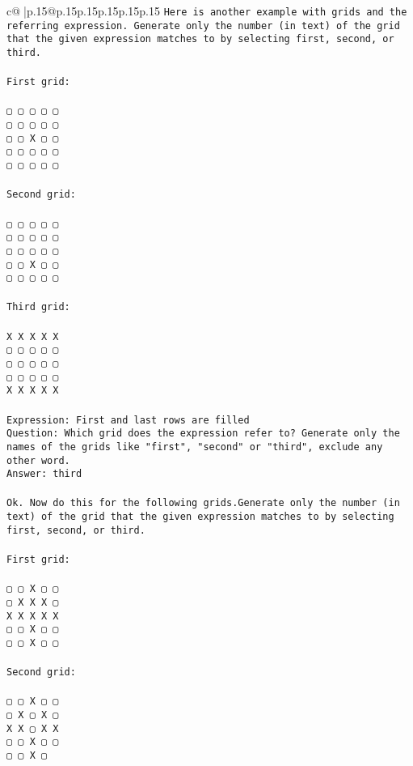\documentclass{article}
\begin{document}
{\begin{supertabular}{c@{$\;$}|p{.15\linewidth}@{}p{.15\linewidth}p{.15\linewidth}p{.15\linewidth}p{.15\linewidth}p{.15\linewidth}}
{{{\tt Here is another example with grids and the referring expression. Generate only the number (in text) of the grid that the given expression matches to by selecting first, second, or third.\\ \tt \\ \tt First grid:\\ \tt \\ \tt ▢ ▢ ▢ ▢ ▢\\ \tt ▢ ▢ ▢ ▢ ▢\\ \tt ▢ ▢ X ▢ ▢\\ \tt ▢ ▢ ▢ ▢ ▢\\ \tt ▢ ▢ ▢ ▢ ▢\\ \tt \\ \tt Second grid:\\ \tt \\ \tt ▢ ▢ ▢ ▢ ▢\\ \tt ▢ ▢ ▢ ▢ ▢\\ \tt ▢ ▢ ▢ ▢ ▢\\ \tt ▢ ▢ X ▢ ▢\\ \tt ▢ ▢ ▢ ▢ ▢\\ \tt \\ \tt Third grid:\\ \tt \\ \tt X X X X X\\ \tt ▢ ▢ ▢ ▢ ▢\\ \tt ▢ ▢ ▢ ▢ ▢\\ \tt ▢ ▢ ▢ ▢ ▢\\ \tt X X X X X\\ \tt \\ \tt Expression: First and last rows are filled\\ \tt Question: Which grid does the expression refer to? Generate only the names of the grids like "first", "second" or "third", exclude any other word.\\ \tt Answer: third\\ \tt \\ \tt Ok. Now do this for the following grids.Generate only the number (in text) of the grid that the given expression matches to by selecting first, second, or third.\\ \tt \\ \tt First grid:\\ \tt \\ \tt ▢ ▢ X ▢ ▢\\ \tt ▢ X X X ▢\\ \tt X X X X X\\ \tt ▢ ▢ X ▢ ▢\\ \tt ▢ ▢ X ▢ ▢\\ \tt \\ \tt Second grid:\\ \tt \\ \tt ▢ ▢ X ▢ ▢\\ \tt ▢ X ▢ X ▢\\ \tt X X ▢ X X\\ \tt ▢ ▢ X ▢ ▢\\ \tt ▢ ▢ X ▢ }}}
\end{supertabular}}
\end{document}

